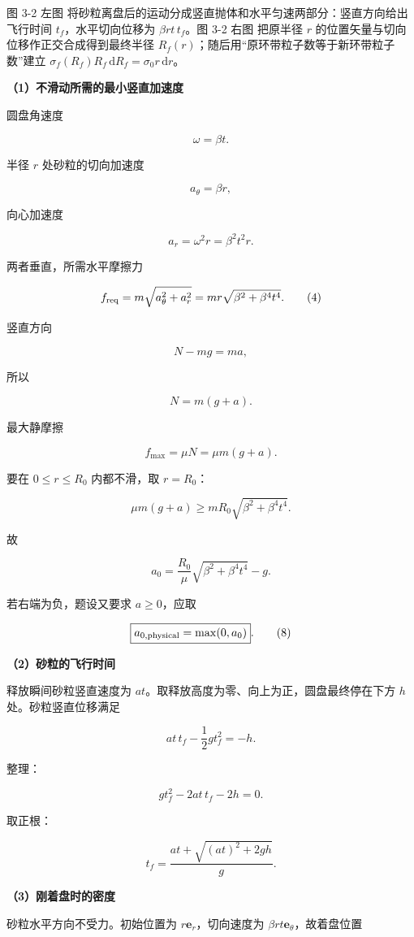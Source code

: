 \documentclass[12pt,a4paper,UTF8]{ctexart}
\begin{document}
图 3-2 左图
将砂粒离盘后的运动分成竖直抛体和水平匀速两部分：竖直方向给出飞行时间
\(t_f\)，水平切向位移为 \(\beta rt\,t_f\)。图 3-2 右图 把原半径 \(r\)
的位置矢量与切向位移作正交合成得到最终半径
\(R_f(r)\)；随后用``原环带粒子数等于新环带粒子数''建立
\(\sigma_f(R_f)R_f\,\mathrm dR_f=\sigma_0r\,\mathrm dr\)。

\textbf{（1）不滑动所需的最小竖直加速度}

圆盘角速度

\[
\omega=\beta t.
\tag{1}
\]

半径 \(r\) 处砂粒的切向加速度

\[
a_\theta=\beta r,
\tag{2}
\]

向心加速度

\[
a_r=\omega^2r=\beta^2t^2r.
\tag{3}
\]

两者垂直，所需水平摩擦力

\[
f_{\rm req}
=m\sqrt{a_\theta^2+a_r^2}
=mr\sqrt{\beta^2+\beta^4t^4}.
\tag{4}
\]

竖直方向

\[
N-mg=ma,
\]

所以

\[
N=m(g+a).
\tag{5}
\]

最大静摩擦

\[
f_{\max}=\mu N=\mu m(g+a).
\tag{6}
\]

要在 \(0\leq r\leq R_0\) 内都不滑，取 \(r=R_0\)：

\[
\mu m(g+a)
\geq mR_0\sqrt{\beta^2+\beta^4t^4}.
\]

故

\[
\boxed{
a_0
=\frac{R_0}{\mu}
\sqrt{\beta^2+\beta^4t^4}-g
}.
\tag{7}
\]

若右端为负，题设又要求 \(a\geq0\)，应取

\[
\boxed{a_{0,\rm physical}=\max(0,a_0)}.
\tag{8}
\]

\textbf{（2）砂粒的飞行时间}

释放瞬间砂粒竖直速度为
\(at\)。取释放高度为零、向上为正，圆盘最终停在下方 \(h\)
处。砂粒竖直位移满足

\[
at\,t_f-\frac12gt_f^2=-h.
\tag{9}
\]

整理：

\[
gt_f^2-2at\,t_f-2h=0.
\]

取正根：

\[
\boxed{
t_f
=\frac{at+\sqrt{(at)^2+2gh}}{g}
}.
\tag{10}
\]

\textbf{（3）刚着盘时的密度}

砂粒水平方向不受力。初始位置为 \(r\bm e_r\)，切向速度为
\(\beta rt\bm e_\theta\)，故着盘位置
\end{document}
